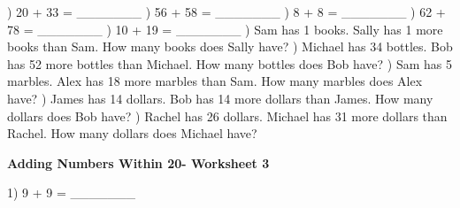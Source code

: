 \documentclass{article}%
\begin{document}
\newline%
) 20 + 33 = \_\_\_\_\_\_\_%
\newline%
\newline%
) 56 + 58 = \_\_\_\_\_\_\_%
\newline%
\newline%
) 8 + 8 = \_\_\_\_\_\_\_%
\newline%
\newline%
) 62 + 78 = \_\_\_\_\_\_\_%
\newline%
\newline%
) 10 + 19 = \_\_\_\_\_\_\_%
\newline%
\newline%
) Sam has 1 books. Sally has 1 more books than Sam. How many books does Sally have?%
\newline%
\newline%
) Michael has 34 bottles. Bob has 52 more bottles than Michael. How many bottles does Bob have?%
\newline%
\newline%
) Sam has 5 marbles. Alex has 18 more marbles than Sam. How many marbles does Alex have?%
\newline%
\newline%
) James has 14 dollars. Bob has 14 more dollars than James. How many dollars does Bob have?%
\newline%
\newline%
) Rachel has 26 dollars. Michael has 31 more dollars than Rachel. How many dollars does Michael have?%
\newline%
\newline%
\newline%
\pagebreak%
\large%
\begin{center}%
\textbf{Adding Numbers Within 20- Worksheet 3}%
\newline%
\newline%
\newline%
\end{center} \normalsize%
1) 9 + 9 = \_\_\_\_\_\_\_%
\newline%
\end{document}
